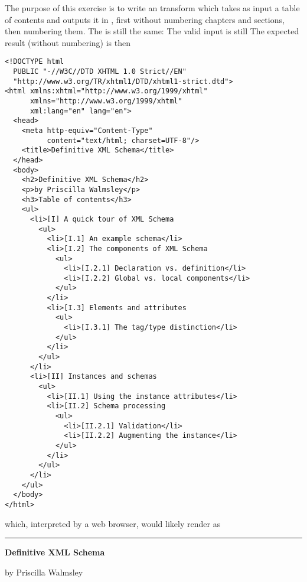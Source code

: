 The purpose of this exercise is to write an \XSLT transform which
takes as input a table of contents and outputs it in \XHTML, first
without numbering chapters and sections, then numbering them. The \DTD
is still the same:
\noindent The valid input is still
\noindent The expected result (without numbering) is then
\begin{verbatim}
<!DOCTYPE html
  PUBLIC "-//W3C//DTD XHTML 1.0 Strict//EN"
  "http://www.w3.org/TR/xhtml1/DTD/xhtml1-strict.dtd">
<html xmlns:xhtml="http://www.w3.org/1999/xhtml"
      xmlns="http://www.w3.org/1999/xhtml"
      xml:lang="en" lang="en">
  <head>
    <meta http-equiv="Content-Type"
          content="text/html; charset=UTF-8"/>
    <title>Definitive XML Schema</title>
  </head>
  <body>
    <h2>Definitive XML Schema</h2>
    <p>by Priscilla Walmsley</p>
    <h3>Table of contents</h3>
    <ul>
      <li>[I] A quick tour of XML Schema
        <ul>
          <li>[I.1] An example schema</li>
          <li>[I.2] The components of XML Schema
            <ul>
              <li>[I.2.1] Declaration vs. definition</li>
              <li>[I.2.2] Global vs. local components</li>
            </ul>
          </li>
          <li>[I.3] Elements and attributes
            <ul>
              <li>[I.3.1] The tag/type distinction</li>
            </ul>
          </li>
        </ul>
      </li>
      <li>[II] Instances and schemas
        <ul>
          <li>[II.1] Using the instance attributes</li>
          <li>[II.2] Schema processing
            <ul>
              <li>[II.2.1] Validation</li>
              <li>[II.2.2] Augmenting the instance</li>
            </ul>
          </li>
        </ul>
      </li>
    </ul>
  </body>
</html>
\end{verbatim}
which, interpreted by a web browser, would likely render as

\noindent\rule{\linewidth}{0.5pt}
\noindent\textbf{\large Definitive XML Schema}

\bigskip

\noindent by Priscilla Walmsley

\bigskip

